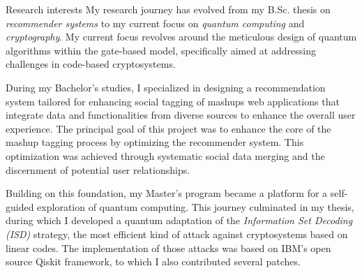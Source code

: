 \documentclass[
	a4paper, %
	10pt, %
]{tresume} %
\begin{document}
\begin{tSection}{Research interests}
  My research journey has evolved from my B.Sc. thesis on \emph{recommender
    systems} to my current focus on \emph{quantum computing} and
  \emph{cryptography}. My current focus revolves around the meticulous design of
  quantum algorithms within the gate-based model, specifically aimed at addressing
  challenges in code-based cryptosystems.

  During my Bachelor's studies, I specialized in designing a recommendation
  system tailored for enhancing social tagging of mashups \textemdash{} web
  applications that integrate data and functionalities from diverse sources to
  enhance the overall user experience. %
  The principal goal of this project was to enhance the core of the mashup
  tagging process by optimizing the recommender system. This optimization was
  achieved through systematic social data merging and the discernment of
  potential user relationships.


  Building on this foundation, my Master's program became a platform for a
  self-guided exploration of quantum computing. This journey culminated in my
  thesis, during which I developed a quantum adaptation of the \emph{Information
    Set Decoding (ISD)} strategy, the most efficient kind of attack against
  cryptosystems based on linear codes. The implementation of those attacks was
  based on IBM's open source Qiskit framework, to which I also contributed
  several patches.


\end{tSection}
\end{document}
